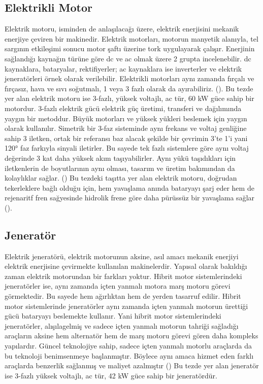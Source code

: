 \subsection{Elektrikli Motor}
\label{elektriklimotor}
Elektrik motoru, isminden de anlaşılacağı üzere, elektrik enerjisini mekanik enerjiye çeviren bir makinedir. Elektrik motorları, 
motorun manyetik alanıyla, tel sargının etkileşimi sonucu motor şaftı üzerine tork uygulayarak çalışır. Enerjinin sağlandığı kaynağın türüne göre
\acrfull{dc} ve \acrfull{ac} olmak üzere 2 grupta incelenebilir. \acrshort{dc} kaynaklara, bataryalar, rektifiyerler; \acrshort{ac} kaynaklara ise
inverterler ve elektrik jeneratörleri örnek olarak verilebilir. Elektrikli motorları aynı zamanda
fırçalı ve fırçasız, hava ve sıvı soğutmalı, 1 veya 3 fazlı olarak da ayırabiliriz. (\cite{electricmotor}).  Bu tezde yer alan elektrik motoru ise 3-fazlı, yüksek voltajlı,
\acrshort{ac} tür, 60 kW güce sahip bir motordur. 3-fazlı elektrik gücü elektrik güç üretimi, transferi ve dağılımında yaygın bir metoddur. Büyük motorları ve
yüksek yükleri beslemek için yaygın olarak kullanılır. Simetrik bir 3-faz sisteminde aynı frekans ve voltaj genliğine sahip 3 iletken, ortak bir referansı baz alacak şekilde
bir çevrimin 3'te 1'i yani 120° faz farkıyla sinyali iletirler. Bu sayede tek fazlı sistemlere göre aynı voltaj değerinde 3 kat daha yüksek akım taşıyabilirler.
Aynı yükü taşıdıkları için iletkenlerin de boyutlarının aynı olması, tasarım ve üretim bakımından da kolaylıklar sağlar. (\cite{threephase}) 
Bu tezdeki taşıtta yer alan elektrik motoru, doğrudan tekerleklere bağlı olduğu için, hem yavaşlama anında bataryayı şarj eder hem de
rejenaritf fren sağyesinde hidrolik frene göre daha pürüssüz bir yavaşlama sağlar (\cite{regenbreak}).  



\subsection{Jeneratör}

Elektrik jeneratörü, elektrik motorunun aksine, asıl amacı mekanik enerjiyi elektrik enerjisine çevirmekte kullanılan makinelerdir. Yapısal olarak bakıldığı zaman elektrik
motorundan bir farkları yoktur. Hibrit motor sistemlerindeki jeneratörler ise, aynı zamanda içten yanmalı motora marş motoru görevi görmektedir. Bu sayede hem ağırlıktan hem de
yerden tasarruf edilir. Hibrit motor sistemlerinde jeneratörler aynı zamanda  içten yanmalı motorun ürettiği gücü bataryayı beslemekte kullanır. Yani 
hibrit motor sistemlerindeki jeneratörler, alışılagelmiş ve sadece içten yanmalı motorun tahriği sağladığı araçların aksine hem alternatör hem de 
marş motoru görevi gören daha kompleks yapılardır. Güncel teknolojiye sahip, sadece içten yanmalı motorlu araçlarda da bu teknoloji benimsenmeye başlanmıştır. Böylece
aynı amaca hizmet eden farklı araçlarda benzerlik sağlanmış ve maliyet azalmıştır (\cite{generator}) Bu tezde yer alan jeneratör ise 3-fazlı
yüksek voltajlı, \acrshort{ac} tür,  42 kW güce sahip bir jeneratördür.



